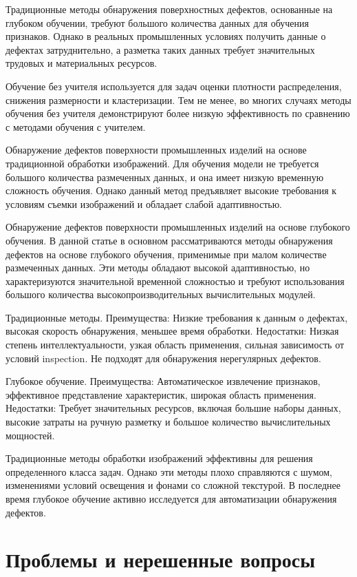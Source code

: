 \documentclass[14pt,a4paper]{article}
\begin{document}
Традиционные методы обнаружения поверхностных дефектов, основанные на глубоком обучении, требуют большого количества данных для обучения признаков. Однако в реальных промышленных условиях получить данные о дефектах затруднительно, а разметка таких данных требует значительных трудовых и материальных ресурсов.
  

Обучение без учителя используется для задач оценки плотности распределения, снижения размерности и кластеризации. Тем не менее, во многих случаях методы обучения без учителя демонстрируют более низкую эффективность по сравнению с методами обучения с учителем. \cite{Czimmermann2020}

Обнаружение дефектов поверхности промышленных изделий на основе традиционной обработки изображений. Для обучения модели не требуется большого количества размеченных данных, и она имеет низкую временную сложность обучения. Однако данный метод предъявляет высокие требования к условиям съемки изображений и обладает слабой адаптивностью.

Обнаружение дефектов поверхности промышленных изделий на основе глубокого обучения. В данной статье в основном рассматриваются методы обнаружения дефектов на основе глубокого обучения, применимые при малом количестве размеченных данных. Эти методы обладают высокой адаптивностью, но характеризуются значительной временной сложностью и требуют использования большого количества высокопроизводительных вычислительных модулей.

Традиционные методы. Преимущества: Низкие требования к данным о дефектах, высокая скорость обнаружения, меньшее время обработки. Недостатки: Низкая степень интеллектуальности, узкая область применения, сильная зависимость от условий inspection. Не подходят для обнаружения нерегулярных дефектов.

Глубокое обучение. Преимущества: Автоматическое извлечение признаков, эффективное представление характеристик, широкая область применения. Недостатки: Требует значительных ресурсов, включая большие наборы данных, высокие затраты на ручную разметку и большое количество вычислительных мощностей. \cite{Xiangjie2022}	

Традиционные методы обработки изображений эффективны для решения определенного класса задач. Однако эти методы плохо справляются с шумом, изменениями условий освещения и фонами со сложной текстурой. В последнее время глубокое обучение активно исследуется для автоматизации обнаружения дефектов.

\section{Проблемы и нерешенные вопросы}
\end{document}
